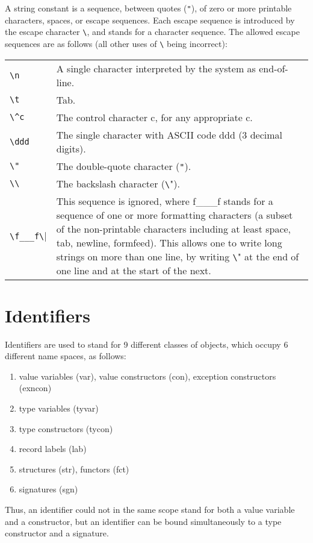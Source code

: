 A string constant is a sequence, between quotes (\verb|"|), of zero or more
printable characters, spaces, or escape sequences.  Each escape sequence
is introduced by the escape character \verb|\|, and stands for a character
sequence.  The allowed escape sequences are as follows (all other
uses of \verb|\| being incorrect):
\begin{tabular}{l p{3.9in}}
\verb|\n| & A single character interpreted by the system as end-of-line.\\
\verb|\t| & Tab. \\
\verb|\^c| & The control character c, for any appropriate c.\\
\verb|\ddd| &  The single character with ASCII code ddd (3 decimal digits).\\
\verb|\"| & The double-quote character (\verb'"'). \\
\verb|\\| &  The backslash character (\verb"\").\\
\verb|\f___f\| & This sequence is ignored, where f\_\_\_f stands for a
sequence of one or more formatting characters (a subset of the
non-printable characters including at least space, tab, newline,
formfeed).  This allows one to write long strings on more than one
line, by writing \verb"\" at the end of one line and at the start of the
next.
\end{tabular}

\section{Identifiers}

Identifiers are used to stand for 9 different classes of objects,
which occupy 6 different name spaces, as follows:
\begin{enumerate}
\item value variables (var), value constructors (con), exception constructors (exncon)
\item type variables (tyvar)
\item type constructors (tycon)
\item record labels (lab)
\item structures (str), functors (fct)
\item signatures (sgn)
\end{enumerate}
Thus, an identifier could not in the same scope stand for both a
value variable and a constructor, but an identifier can
be bound simultaneously to a type constructor and a signature.

